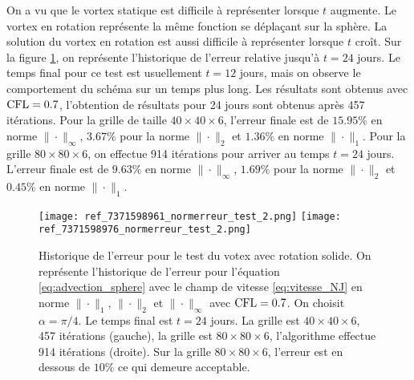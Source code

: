 On a vu que le vortex statique est difficile à représenter lorsque $t$ augmente. Le vortex en rotation représente la même fonction se déplaçant sur la sphère. La solution du vortex en rotation est aussi difficile à représenter lorsque $t$ croît. Sur la figure \ref{fig:NJ24jours}, on représente l'historique de l'erreur relative jusqu'à $t=24$ jours. Le temps final pour ce test est usuellement $t=12$ jours, mais on observe le comportement du schéma sur un temps plus long. Les résultats sont obtenus avec $\text{CFL} = 0.7$, l'obtention de résultats pour 24 jours sont obtenus après 457 itérations. Pour la grille de taille $40 \times 40 \times 6$, l'erreur finale est de $15.95\%$ en norme $\| \cdot \|_{\infty}$, $3.67\%$ pour la norme $\| \cdot \|_{2}$ et $1.36\%$ en norme $\| \cdot \|_{1}$. Pour la grille $80 \times 80 \times 6$, on effectue 914 itérations pour arriver au temps $t=24$ jours. L'erreur finale est de $9.63\%$ en norme $\| \cdot \|_{\infty}$, $1.69\%$ pour la norme $\| \cdot \|_{2}$ et $0.45\%$ en norme $\| \cdot \|_{1}$.

\begin{figure}[htbp]
\begin{center}
\texttt{[image: ref\_7371598961\_normerreur\_test\_2.png]}
\texttt{[image: ref\_7371598976\_normerreur\_test\_2.png]}
\end{center}
\caption{Historique de l'erreur pour le test du votex avec rotation solide. On représente l'historique de l'erreur pour l'équation \eqref{eq:advection_sphere} avec le champ de vitesse \eqref{eq:vitesse_NJ} en norme $\| \cdot \|_1$, $\| \cdot \|_2$ et $\| \cdot \|_{\infty}$ avec $\text{CFL} = 0.7$. On choisit $\alpha = \pi/4$. Le temps final est $t=24$ jours. La grille est $40 \times 40  \times 6$, 457 itérations (gauche), la grille est $80 \times 80  \times 6$, l'algorithme effectue 914 itérations (droite). Sur la grille $80 \times 80 \times 6$, l'erreur est en dessous de $10 \%$ ce qui demeure acceptable.}
\label{fig:NJ24jours}
\end{figure} 

